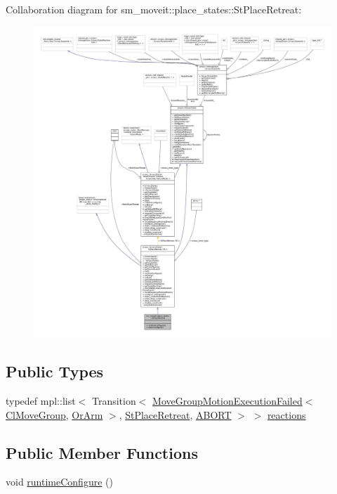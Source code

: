 Collaboration diagram for sm\+\_\+moveit\+:\+:place\+\_\+states\+:\+:St\+Place\+Retreat\+:
\nopagebreak
\begin{figure}[H]
\begin{center}
\leavevmode
\includegraphics[width=350pt]{structsm__moveit_1_1place__states_1_1StPlaceRetreat__coll__graph}
\end{center}
\end{figure}
\subsection*{Public Types}
\begin{DoxyCompactItemize}
\item 
typedef mpl\+::list$<$ Transition$<$ \hyperlink{structsm__moveit_1_1cl__movegroup_1_1MoveGroupMotionExecutionFailed}{Move\+Group\+Motion\+Execution\+Failed}$<$ \hyperlink{classsm__moveit_1_1cl__movegroup_1_1ClMoveGroup}{Cl\+Move\+Group}, \hyperlink{classsm__moveit_1_1OrArm}{Or\+Arm} $>$, \hyperlink{structsm__moveit_1_1place__states_1_1StPlaceRetreat}{St\+Place\+Retreat}, \hyperlink{classABORT}{A\+B\+O\+RT} $>$ $>$ \hyperlink{structsm__moveit_1_1place__states_1_1StPlaceRetreat_a63015ae143e5815bb2c3fb4a2f3dc16d}{reactions}
\end{DoxyCompactItemize}
\subsection*{Public Member Functions}
\begin{DoxyCompactItemize}
\item 
void \hyperlink{structsm__moveit_1_1place__states_1_1StPlaceRetreat_ab821f5ef9e9ffb35ba9f63917dac2854}{runtime\+Configure} ()
\end{DoxyCompactItemize}

